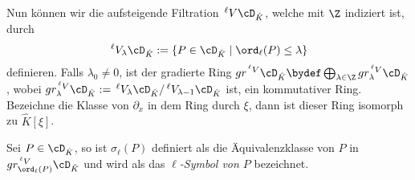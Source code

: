 Nun können wir die aufsteigende Filtration $\,^\ell V\cD_{\hat K}$, welche mit
$\Z$ indiziert ist, durch
\[
\,^\ell V_\lambda\cD_{\hat K}:=\{P\in\cD_{\hat K}\mid \ord_\ell(P)\leq \lambda\}
\]
definieren.
Falls $\lambda_0\neq 0$, ist der gradierte Ring $gr^{\,^\ell V}\cD_{\hat
K}\bydef \bigoplus_{\lambda \in \Z}gr_\lambda^{\,^\ell V}\cD_{\hat K}$, wobei
\linebreak
$gr_\lambda^{\,^\ell V}\cD_{\hat K}:=\,^\ell V_\lambda\cD_{\hat K}/\,^\ell
V_{\lambda-1}\cD_{\hat K}$ ist, ein kommutativer Ring. Bezeichne die Klasse von
$\partial_x$ in dem Ring durch $\xi$, dann ist dieser Ring isomorph zu $\hat
K[\xi]$.
\begin{defn}
Sei $P\in \cD_{\hat K}$, so ist $\sigma_\ell(P)$ definiert als die
Äquivalenzklasse von $P$ in $gr_{\ord_\ell(P)}^{\,^\ell V}\cD_{\hat K}$ und
wird als das \emph{$\ell$-Symbol von $P$} bezeichnet.
\end{defn}
